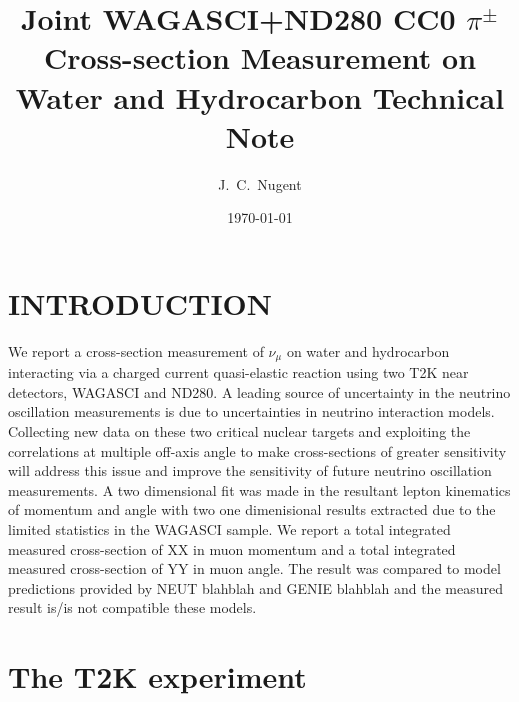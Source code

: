 \documentclass[%
 reprint,
 amsmath,amssymb,
 aps,
]{revtex4-2}
\begin{document}
\preprint{}

\title{Joint WAGASCI+ND280 CC0 $\pi^{\pm}$ Cross-section Measurement on Water and Hydrocarbon Technical Note}


\author{J.~C.~Nugent}

\date{\today}%

\begin{abstract}
 
\end{abstract}

\maketitle


\section{\label{Sect:Intro}INTRODUCTION}

We report a cross-section measurement of $\nu_{\mu}$ on water and hydrocarbon interacting via a charged current quasi-elastic reaction using two T2K near detectors, WAGASCI and ND280. A leading source of uncertainty in the neutrino oscillation measurements is due to uncertainties in neutrino interaction models. Collecting new data on these two critical nuclear targets and exploiting the correlations at multiple off-axis angle to make cross-sections of greater sensitivity will address this issue and improve the sensitivity of future neutrino oscillation measurements. A two dimensional fit was made in the resultant lepton kinematics of momentum and angle with two one dimenisional results extracted due to the limited statistics in the WAGASCI sample. We report a total integrated measured cross-section of XX in muon momentum and a total integrated measured cross-section of YY in muon angle. The result was compared to model predictions provided by NEUT blahblah and GENIE blahblah and the measured result is/is not compatible these models.

\section{\label{Sect:Method}The T2K experiment}
\end{document}
